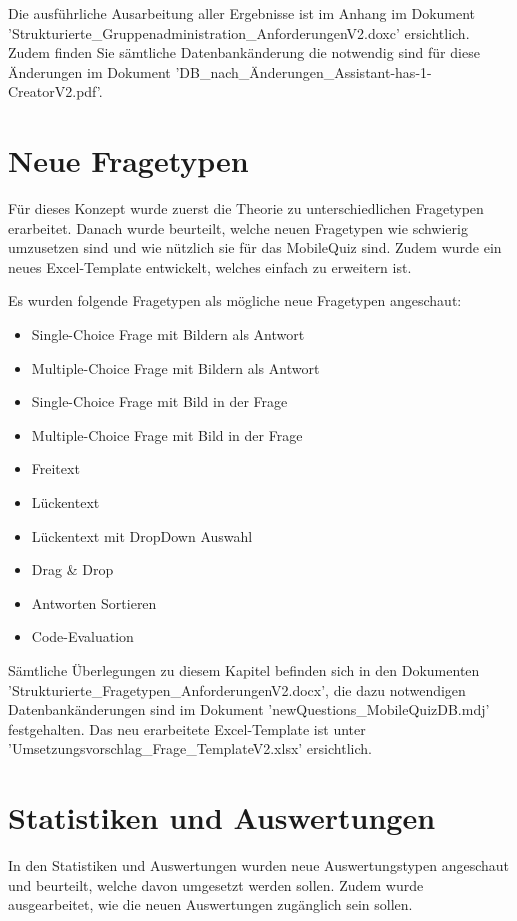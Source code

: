 \bigskip

Die ausführliche Ausarbeitung aller Ergebnisse ist im Anhang im Dokument 'Strukturierte\_Gruppenadministration\_AnforderungenV2.doxc' ersichtlich. Zudem finden Sie sämtliche Datenbankänderung die notwendig sind für diese Änderungen im Dokument 'DB\_nach\_Änderungen\_Assistant-has-1-CreatorV2.pdf'.


\section{Neue Fragetypen}
Für dieses Konzept wurde zuerst die Theorie zu unterschiedlichen Fragetypen erarbeitet. Danach wurde beurteilt, welche neuen Fragetypen wie schwierig umzusetzen sind und wie nützlich sie für das MobileQuiz sind. Zudem wurde ein neues Excel-Template entwickelt, welches einfach zu erweitern ist.

\bigskip

\noindent Es wurden folgende Fragetypen als mögliche neue Fragetypen angeschaut:
\begin{itemize}
	\item Single-Choice Frage mit Bildern als Antwort
	\item Multiple-Choice Frage mit Bildern als Antwort
	\item Single-Choice Frage mit Bild in der Frage
	\item Multiple-Choice Frage mit Bild in der Frage
	\item Freitext
	\item Lückentext
	\item Lückentext mit DropDown Auswahl
	\item Drag \& Drop
	\item Antworten Sortieren
	\item Code-Evaluation
\end{itemize}

\bigskip

Sämtliche Überlegungen zu diesem Kapitel befinden sich in den Dokumenten 'Strukturierte\_Fragetypen\_AnforderungenV2.docx', die dazu notwendigen Datenbankänderungen sind im Dokument 'newQuestions\_MobileQuizDB.mdj' festgehalten.
Das neu erarbeitete Excel-Template ist unter 'Umsetzungsvorschlag\_Frage\_TemplateV2.xlsx' ersichtlich.

\section{Statistiken und Auswertungen}
In den Statistiken und Auswertungen wurden neue Auswertungstypen angeschaut und beurteilt, welche davon umgesetzt werden sollen. Zudem wurde ausgearbeitet, wie die neuen Auswertungen zugänglich sein sollen.

